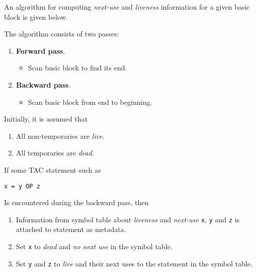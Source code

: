 \begin{definition}
    An algorithm for computing \textit{next-use} and \textit{liveness} information for a given basic block is given below.
    
    The algorithm consists of two passes:
    \begin{enumerate}
        \item \textbf{Forward pass}.
        \begin{itemize}
            \item Scan basic block to find its end.
        \end{itemize}
        \item \textbf{Backward pass}.
        \begin{itemize}
            \item Scan basic block from end to beginning.
        \end{itemize}
    \end{enumerate}
    
    Initially, it is assumed that
    \begin{enumerate}
        \item All non-temporaries are \textit{live}.
        \item All temporaries are \textit{dead}.
    \end{enumerate}
    
    If some TAC statement such as
    \begin{verbatim}
x = y OP z
    \end{verbatim}
    
    Is encountered during the backward pass, then
    \begin{enumerate}
        \item Information from symbol table about \textit{liveness} and \textit{next-use} \texttt{x}, \texttt{y} and \texttt{z} is attached to statement as metadata.
        \item Set \texttt{x} to \textit{dead} and \textit{no next use} in the symbol table.
        \item Set \texttt{y} and \texttt{z} to \textit{live} and their next uses to the statement in the symbol table.
    \end{enumerate}
\end{definition}

